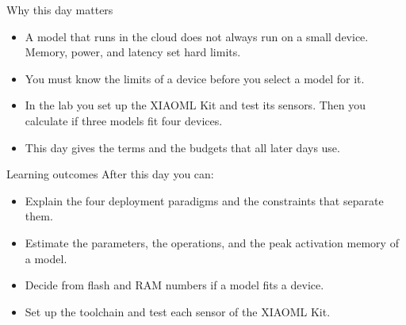 \begin{frame}{Why this day matters}
  \begin{itemize}
    \item A model that runs in the cloud does not always run on a small
          device. Memory, power, and latency set hard limits.
    \item You must know the limits of a device before you select a model
          for it.
    \item In the lab you set up the XIAOML Kit and test its sensors. Then
          you calculate if three models fit four devices.
    \item This day gives the terms and the budgets that all later days use.
  \end{itemize}
\end{frame}

\begin{frame}{Learning outcomes}
  After this day you can:
  \begin{itemize}
    \item Explain the four deployment paradigms and the constraints that
          separate them.
    \item Estimate the parameters, the operations, and the peak activation
          memory of a model.
    \item Decide from flash and RAM numbers if a model fits a device.
    \item Set up the toolchain and test each sensor of the XIAOML Kit.
  \end{itemize}
\end{frame}
